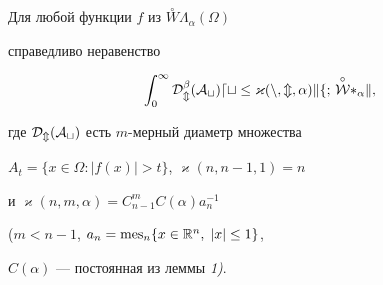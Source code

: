 \begin{lem} 


Для любой функции $f$ из $\overset{\circ}{W}\Lambda_\alpha(\Omega)$ 


справедливо неравенство 


\begin{equation} 




\int_0^\infty\cal D^\beta_m(A_t)dt \le\varkappa(n,m,\alpha) 


\|f;\,\overset{\circ}{W}\Lambda_\alpha\|, 


\end{equation} 


где $\cal D_m(A_t)$ есть $m$-мерный диаметр множества 


$A_t=\{x\in\Omega:|f(x)|>t\}$, $\varkappa(n,n-1,1)=n$ 


и $\varkappa(n,m,\alpha)=C^m_{n-1}C(\alpha)a_n^{-1}$ 


($m<n-1$, $a_n=\operatorname{mes}_n\{x\in\Bbb R^n,\;|x|\le 1\}$, 


$C(\alpha)$ --- постоянная из леммы {\em 1)}. 


\end{lem} 


 


